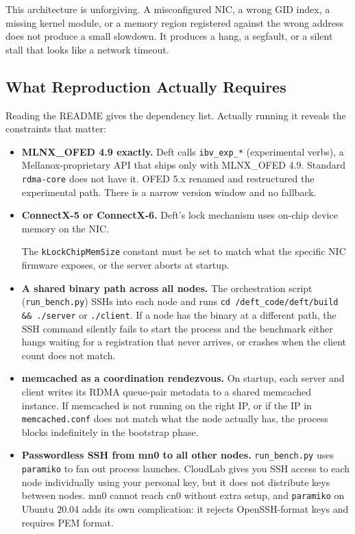 \documentclass[10pt]{article}
\begin{document}
This architecture is unforgiving.
A misconfigured NIC, a wrong GID index, a missing kernel module, or a memory
region registered against the wrong address does not produce a small slowdown.
It produces a hang, a segfault, or a silent stall that looks like a network timeout.

\subsection{What Reproduction Actually Requires}

Reading the README gives the dependency list.
Actually running it reveals the constraints that matter:

\begin{itemize}[nosep]
  \item \textbf{MLNX\_OFED 4.9 exactly.}
    Deft calls \texttt{ibv\_exp\_*} (experimental verbs), a Mellanox-proprietary API
    that ships only with MLNX\_OFED 4.9.
    Standard \texttt{rdma-core} does not have it.
    OFED 5.x renamed and restructured the experimental path.
    There is a narrow version window and no fallback.

  \item \textbf{ConnectX-5 or ConnectX-6.}
    Deft's lock mechanism uses on-chip device memory on the NIC.

    The \texttt{kLockChipMemSize} constant must be set to match what the
    specific NIC firmware exposes, or the server aborts at startup.

  \item \textbf{A shared binary path across all nodes.}
    The orchestration script (\texttt{run\_bench.py}) SSHs into each node and runs
    \texttt{cd /deft\_code/deft/build \&\& ./server} or \texttt{./client}.
    If a node has the binary at a different path, the SSH command silently fails
    to start the process and the benchmark either hangs waiting for a registration
    that never arrives, or crashes when the client count does not match.

  \item \textbf{memcached as a coordination rendezvous.}
    On startup, each server and client writes its RDMA queue-pair metadata to
    a shared memcached instance.
    If memcached is not running on the right IP, or if the IP in
    \texttt{memcached.conf} does not match what the node actually has,
    the process blocks indefinitely in the bootstrap phase.

  \item \textbf{Passwordless SSH from mn0 to all other nodes.}
    \texttt{run\_bench.py} uses \texttt{paramiko} to fan out process launches.
    CloudLab gives you SSH access to each node individually using your personal key,
    but it does not distribute keys between nodes.
    mn0 cannot reach cn0 without extra setup, and \texttt{paramiko} on Ubuntu 20.04
    adds its own complication: it rejects OpenSSH-format keys and requires PEM format.


\end{itemize}
\end{document}
